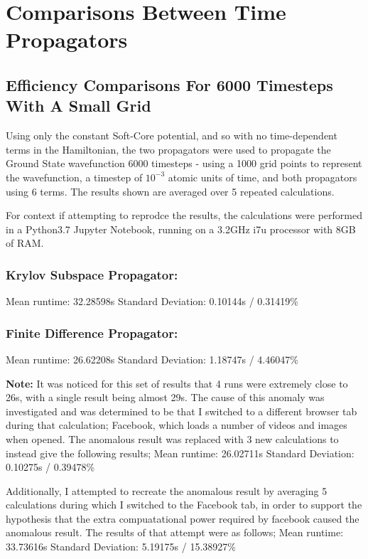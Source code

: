 \section{Comparisons Between Time Propagators}

\subsection{Efficiency Comparisons For 6000 Timesteps With A Small Grid}
Using only the constant Soft-Core potential, and so with no time-dependent terms in the Hamiltonian, the two propagators were used to propagate the Ground State wavefunction 6000 timesteps - using a 1000 grid points to represent the wavefunction, a timestep of $10^{-3}$ atomic units of time, and both propagators using 6 terms. The results shown are averaged over 5 repeated calculations. 

For context if attempting to reprodce the results, the calculations were performed in a Python3.7 Jupyter Notebook, running on a 3.2GHz i7u processor with 8GB of RAM.

\subsubsection{Krylov Subspace Propagator:}
Mean runtime: \hspace{2cm} 32.28598s\newline
Standard Deviation: 0.10144s / 0.31419\%

\subsubsection{Finite Difference Propagator:}
Mean runtime: 26.62208s\newline
Standard Deviation: 1.18747s / 4.46047\%

\textbf{Note:} It was noticed for this set of results that 4 runs were extremely close to 26s, with a single result being almost 29s. The cause of this anomaly was investigated and was determined to be that I switched to a different browser tab during that calculation; Facebook, which loads a number of videos and images when opened. The anomalous result was replaced with 3 new calculations to instead give the following results;\newline
Mean runtime: \hspace{2cm} 26.02711s\newline
Standard Deviation: 0.10275s / 0.39478\%

Additionally, I attempted to recreate the anomalous result by averaging 5 calculations during which I switched to the Facebook tab, in order to support the hypothesis that the extra compuatational power required by facebook caused the anomalous result. The results of that attempt were as follows;\newline
Mean runtime: \hspace{2cm} 33.73616s\newline
Standard Deviation: 5.19175s / 15.38927\%

